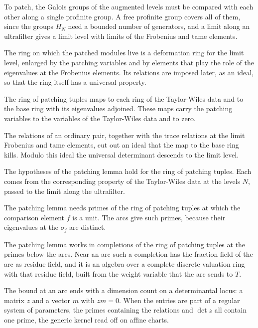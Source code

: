 To patch, the Galois groups of the augmented levels must be compared with each other along a single profinite group. A free profinite group covers all of them, since the groups $H_N$ need a bounded number of generators, and a limit along an ultrafilter gives a limit level with limits of the Frobenius and tame elements.

The ring on which the patched modules live is a deformation ring for the limit level, enlarged by the patching variables and by elements that play the role of the eigenvalues at the Frobenius elements. Its relations are imposed later, as an ideal, so that the ring itself has a universal property.

The ring of patching tuples maps to each ring of the Taylor-Wiles data and to the base ring with its eigenvalues adjoined. These maps carry the patching variables to the variables of the Taylor-Wiles data and to zero.

The relations of an ordinary pair, together with the trace relations at the limit Frobenius and tame elements, cut out an ideal that the map to the base ring kills. Modulo this ideal the universal determinant descends to the limit level.

The hypotheses of the patching lemma hold for the ring of patching tuples. Each comes from the corresponding property of the Taylor-Wiles data at the levels $N$, passed to the limit along the ultrafilter.

The patching lemma needs primes of the ring of patching tuples at which the comparison element $f$ is a unit. The arcs give such primes, because their eigenvalues at the $\sigma_j$ are distinct.

The patching lemma works in completions of the ring of patching tuples at the primes below the arcs. Near an arc such a completion has the fraction field of the arc as residue field, and it is an algebra over a complete discrete valuation ring with that residue field, built from the weight variable that the arc sends to $T$.

The bound at an arc ends with a dimension count on a determinantal locus: a matrix $z$ and a vector $m$ with $zm=0$. When the entries are part of a regular system of parameters, the primes containing the relations and $\det z$ all contain one prime, the generic kernel read off on affine charts.

